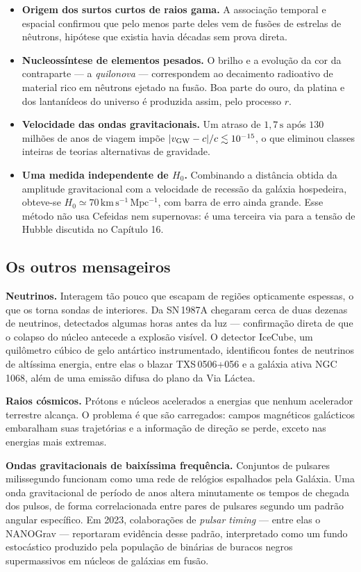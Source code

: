 \documentclass[11pt,a4paper]{article}
\begin{document}
\begin{itemize}
\item \textbf{Origem dos surtos curtos de raios gama.} A associação temporal e espacial confirmou que pelo menos parte deles vem de fusões de estrelas de nêutrons, hipótese que existia havia décadas sem prova direta.
\item \textbf{Nucleossíntese de elementos pesados.} O brilho e a evolução da cor da contraparte --- a \textit{quilonova} --- correspondem ao decaimento radioativo de material rico em nêutrons ejetado na fusão. Boa parte do ouro, da platina e dos lantanídeos do universo é produzida assim, pelo processo $r$.
\item \textbf{Velocidade das ondas gravitacionais.} Um atraso de $1{,}7\,\mathrm{s}$ após $130$ milhões de anos de viagem impõe $|v_{\rm GW}-c|/c\lesssim10^{-15}$, o que eliminou classes inteiras de teorias alternativas de gravidade.
\item \textbf{Uma medida independente de $H_0$.} Combinando a distância obtida da amplitude gravitacional com a velocidade de recessão da galáxia hospedeira, obteve-se $H_0\simeq70\,\mathrm{km\,s^{-1}\,Mpc^{-1}}$, com barra de erro ainda grande. Esse método não usa Cefeidas nem supernovas: é uma terceira via para a tensão de Hubble discutida no Capítulo 16.
\end{itemize}

\subsection*{Os outros mensageiros}

\textbf{Neutrinos.} Interagem tão pouco que escapam de regiões opticamente espessas, o que os torna sondas de interiores. Da SN\,1987A chegaram cerca de duas dezenas de neutrinos, detectados algumas horas antes da luz --- confirmação direta de que o colapso do núcleo antecede a explosão visível. O detector IceCube, um quilômetro cúbico de gelo antártico instrumentado, identificou fontes de neutrinos de altíssima energia, entre elas o blazar TXS\,0506+056 e a galáxia ativa NGC\,1068, além de uma emissão difusa do plano da Via Láctea.

\textbf{Raios cósmicos.} Prótons e núcleos acelerados a energias que nenhum acelerador terrestre alcança. O problema é que são carregados: campos magnéticos galácticos embaralham suas trajetórias e a informação de direção se perde, exceto nas energias mais extremas.

\textbf{Ondas gravitacionais de baixíssima frequência.} Conjuntos de pulsares milissegundo funcionam como uma rede de relógios espalhados pela Galáxia. Uma onda gravitacional de período de anos altera minutamente os tempos de chegada dos pulsos, de forma correlacionada entre pares de pulsares segundo um padrão angular específico. Em 2023, colaborações de \textit{pulsar timing} --- entre elas o NANOGrav --- reportaram evidência desse padrão, interpretado como um fundo estocástico produzido pela população de binárias de buracos negros supermassivos em núcleos de galáxias em fusão.
\end{document}
